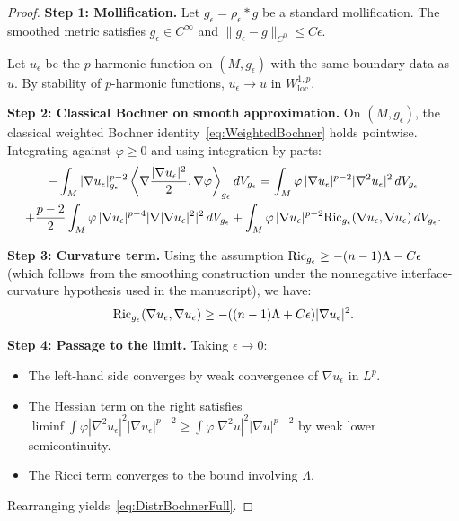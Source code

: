 \begin{proof}
\textbf{Step 1: Mollification.}
Let $g_\epsilon = \rho_\epsilon * g$ be a standard mollification. The smoothed metric satisfies $g_\epsilon \in C^\infty$ and $\|g_\epsilon - g\|_{C^0} \le C\epsilon$.

Let $u_\epsilon$ be the $p$-harmonic function on $(M, g_\epsilon)$ with the same boundary data as $u$. By stability of $p$-harmonic functions, $u_\epsilon \to u$ in $W^{1,p}_{\mathrm{loc}}$.

\textbf{Step 2: Classical Bochner on smooth approximation.}
On $(M, g_\epsilon)$, the classical weighted Bochner identity~\eqref{eq:WeightedBochner} holds pointwise. Integrating against $\varphi \ge 0$ and using integration by parts:
\begin{multline}
    -\int_M |\nabla u_\epsilon|_{g_\epsilon}^{p-2} \left\langle \nabla \frac{|\nabla u_\epsilon|^2}{2}, \nabla \varphi \right\rangle_{g_\epsilon} dV_{g_\epsilon} = \int_M \varphi \, |\nabla u_\epsilon|^{p-2} |\nabla^2 u_\epsilon|^2 \, dV_{g_\epsilon} \\
    + \frac{p-2}{2} \int_M \varphi \, |\nabla u_\epsilon|^{p-4} |\nabla |\nabla u_\epsilon|^2|^2 \, dV_{g_\epsilon} + \int_M \varphi \, |\nabla u_\epsilon|^{p-2} \mathrm{Ric}_{g_\epsilon}(\nabla u_\epsilon, \nabla u_\epsilon) \, dV_{g_\epsilon}.
\end{multline}

\textbf{Step 3: Curvature term.}
Using the assumption $\mathrm{Ric}_{g_\epsilon} \ge -(n-1)\Lambda - C\epsilon$ (which follows from the smoothing construction under the nonnegative interface-curvature hypothesis used in the manuscript), we have:
\begin{equation}
    \mathrm{Ric}_{g_\epsilon}(\nabla u_\epsilon, \nabla u_\epsilon) \ge -((n-1)\Lambda + C\epsilon) |\nabla u_\epsilon|^2.
\end{equation}

\textbf{Step 4: Passage to the limit.}
Taking $\epsilon \to 0$:
\begin{itemize}
    \item The left-hand side converges by weak convergence of $\nabla u_\epsilon$ in $L^p$.
    \item The Hessian term on the right satisfies $\liminf \int \varphi |\nabla^2 u_\epsilon|^2 |\nabla u_\epsilon|^{p-2} \ge \int \varphi |\nabla^2 u|^2 |\nabla u|^{p-2}$ by weak lower semicontinuity.
    \item The Ricci term converges to the bound involving $\Lambda$.
\end{itemize}
Rearranging yields~\eqref{eq:DistrBochnerFull}.
\end{proof}

